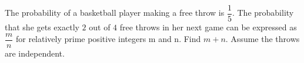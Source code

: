 The probability of a basketball player making a free throw is $\dfrac{1}{5}$. The probability that she gets exactly $2$ out of $4$ free throws in her next game can be expressed as $\dfrac{m}{n}$ for relatively prime positive integers m and n. Find $m + n$. Assume the throws are independent.

